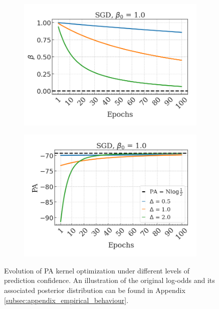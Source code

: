 \begin{figure}[t]
    \centering
    \begin{subfigure}[b]{0.45\textwidth}
        \centering
        \includegraphics[width=\textwidth]{img/results_discussion/empirical/nonrob_met=betas_hue=ldiff.png}
    \end{subfigure}
    \hfill
    \begin{subfigure}[b]{0.45\textwidth}
        \centering
        \includegraphics[width=\textwidth]{img/results_discussion/empirical/nonrob_met=logPA_hue=ldiff.png}
    \end{subfigure}
    \caption{Evolution of PA kernel optimization under different levels of prediction 
    confidence. An illustration of the original log-odds and its associated posterior distribution
    can be found in Appendix \ref{subsec:appendix_empirical_behaviour}.}
    \label{fig:prediction_confidence}
\end{figure}

